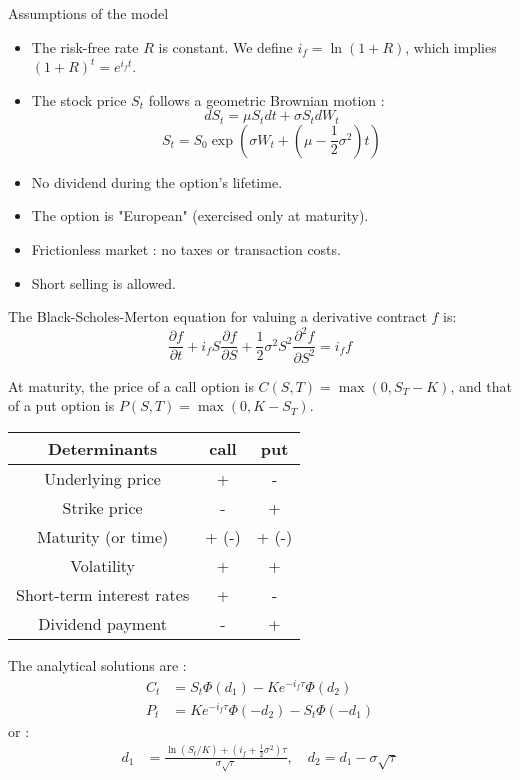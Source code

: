 \begin{f}
Assumptions of the model
\begin{itemize}
	\item The risk-free rate $R$ is constant. We define $i_f = \ln(1+R)$, which implies $(1+R)^t = e^{i_f t}$.
	\item The stock price $S_t$ follows a geometric Brownian motion :
	$$
	dS_t = \mu S_t dt + \sigma S_t dW_t 
	$$
	$$
	 S_t = S_0 \exp\left(\sigma W_t + \left( \mu - \frac{1}{2}\sigma^2 \right)t \right)
	$$
	\item No dividend during the option's lifetime.  
	\item The option is "European" (exercised only at maturity).  
	\item Frictionless market : no taxes or transaction costs.  
	\item Short selling is allowed. 
\end{itemize}

The Black-Scholes-Merton equation for valuing a derivative contract $f$ is:
$$
\frac{\partial f}{\partial t} + i_f S \frac{\partial f}{\partial S} + \frac{1}{2}\sigma^2 S^2 \frac{\partial^2 f}{\partial S^2} = i_f f
$$

At maturity, the price of a call option is $C(S,T) = \max(0, S_T - K)$, and that of a put option is $P(S,T) = \max(0, K - S_T)$.


\begin{center}
	\begin{tabular}{|c|c|c|}
		\hline
		Determinants & \textbf{call}&\textbf{put}\\
		\hline
		Underlying price	      & +&	-\\
		Strike price	              & -&	+\\
		Maturity (or time)    & + (-)&	+ (-)\\
		Volatility	              & +&	+\\
		Short-term interest rates  & +&	-\\
		Dividend payment	      & -&	+\\
		\hline
	\end{tabular}
\end{center}

The analytical solutions are :
\begin{align*}
	C_t &= S_t \Phi(d_1) - Ke^{-i_f \tau} \Phi(d_2) \\
	P_t &= Ke^{-i_f \tau} \Phi(-d_2) - S_t \Phi(-d_1)
\end{align*}
or :
\begin{align*}
	d_1 &= \frac{\ln(S_t/K) + (i_f + \frac{1}{2}\sigma^2)\tau}{\sigma \sqrt{\tau}}, \quad
	d_2 = d_1 - \sigma \sqrt{\tau}
\end{align*}


\end{f}
